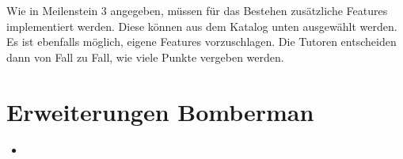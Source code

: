 \documentclass{programmierpraktikum}
\subtitle{Bomberman}
\begin{document}
\maketitle
Wie in Meilenstein 3 angegeben, müssen für das Bestehen zusätzliche Features implementiert werden. Diese können aus dem Katalog unten ausgewählt werden. Es ist ebenfalls möglich, eigene Features vorzuschlagen. Die Tutoren entscheiden dann von Fall zu Fall, wie viele Punkte vergeben werden.
\section{Erweiterungen Bomberman}
\begin{itemize}
  \item 
\end{itemize}
\end{document}
